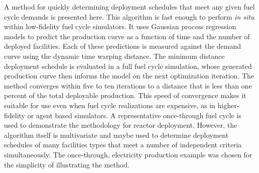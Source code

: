 A method for quickly determining deployment schedules that meet any given
fuel cycle demands is presented here. This algorithm is fast enough to
perform \emph{in situ} within low-fidelity fuel cycle simulators. It uses
Gaussian process regression models to predict the production curve as a
function of time and the number of deployed facilities. Each of these
predictions is measured against the demand curve using the dynamic time
warping distance. The minimum distance deployment schedule is evaluated
in a full fuel cycle simulation, whose generated production curve
then informs the model on the next optimization iteration. The method
converges within five to ten iterations to a distance that is less than one
percent of the total deployable production. This speed of convergence makes
it suitable for use even when fuel cycle realizations are expensive, as in
higher-fidelity or agent based simulators. A representative once-through
fuel cycle is used to demonstrate the methodology for reactor deployment.
However, the algorithm itself is multivariate and maybe used to determine
deployment schedules of many facilities types that meet a number of
independent criteria simultaneously. The once-through, electricity production
example was chosen for the simplicity of illustrating the method.
